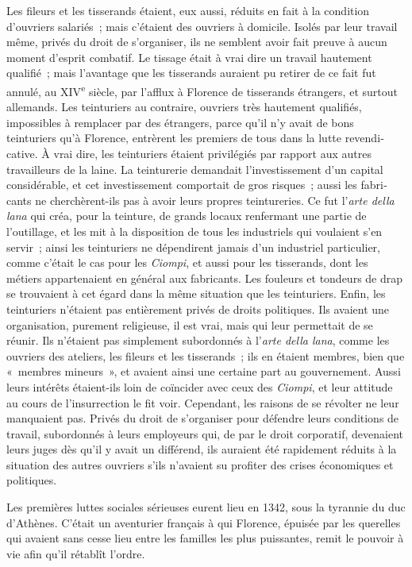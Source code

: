 \documentclass[french,twoside]{book} %
\begin{document}
Les fileurs et les tisserands étaient, eux aussi, réduits en fait à la condition d'ouvriers salariés ; mais c'étaient des ouvriers à domicile. Isolés par leur travail même, privés du droit de s'organiser, ils ne semblent avoir fait preuve à aucun moment d'esprit combatif. Le tissage était à vrai dire un travail haute­ment qualifié ; mais l'avantage que les tisserands auraient pu retirer de ce fait fut annulé, au XIV\textsuperscript{e} siècle, par l'afflux à Florence de tisserands étrangers, et surtout allemands. Les teinturiers au contraire, ouvriers très hautement quali­fiés, impossibles à remplacer par des étrangers, parce qu'il n'y avait de bons teinturiers qu'à Florence, entrèrent les premiers de tous dans la lutte revendi­cative. À vrai dire, les teinturiers étaient privilégiés par rapport aux autres travailleurs de la laine. La teinturerie demandait l'investissement d'un capital considérable, et cet investissement comportait de gros risques ; aussi les fabri­cants ne cherchèrent-ils pas à avoir leurs propres teintureries. Ce fut l’{\itshape arte della lana} qui créa, pour la teinture, de grands locaux renfermant une partie de l'outillage, et les mit à la disposition de tous les industriels qui voulaient s'en servir ; ainsi les teinturiers ne dépendirent jamais d'un industriel particulier, comme c'était le cas pour les {\itshape Ciompi}, et aussi pour les tisserands, dont les métiers appartenaient en général aux fabricants. Les fouleurs et tondeurs de drap se trouvaient à cet égard dans la même situation que les teinturiers. Enfin, les teinturiers n'étaient pas entièrement privés de droits politiques. Ils avaient une organisation, purement religieuse, il est vrai, mais qui leur permet­tait de se réunir. Ils n'étaient pas simplement subordonnés à l’{\itshape arte della lana}, comme les ouvriers des ateliers, les fileurs et les tisserands ; ils en étaient membres, bien que « membres mineurs », et avaient ainsi une certaine part au gouvernement. Aussi leurs intérêts étaient-ils loin de coïncider avec ceux des {\itshape Ciompi}, et leur attitude au cours de l'insurrection le fit voir. Cependant, les raisons de se révolter ne leur manquaient pas. Privés du droit de s'organiser pour défendre leurs conditions de travail, subordonnés à leurs employeurs qui, de par le droit corporatif, devenaient leurs juges dès qu'il y avait un différend, ils auraient été rapidement réduits à la situation des autres ouvriers s'ils n'avaient su profiter des crises économiques et politiques.\par
Les premières luttes sociales sérieuses eurent lieu en 1342, sous la tyran­nie du duc d'Athènes. C'était un aventurier français à qui Florence, épuisée par les querelles qui avaient sans cesse lieu entre les familles les plus puissantes, remit le pouvoir à vie afin qu'il rétablît l'ordre.\par
\end{document}
